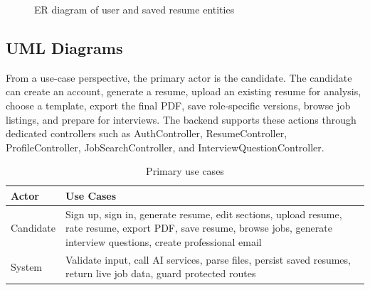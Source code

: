 \begin{figure}[H]
\centering
{}
\caption{ER diagram of user and saved resume entities}
\end{figure}

\subsection{UML Diagrams}
\noindent From a use-case perspective, the primary actor is the candidate. The candidate can create an account, generate a resume, upload an existing resume for analysis, choose a template, export the final PDF, save role-specific versions, browse job listings, and prepare for interviews. The backend supports these actions through dedicated controllers such as AuthController, ResumeController, ProfileController, JobSearchController, and InterviewQuestionController.

\begin{table}[H]
\centering
\caption{Primary use cases}
\begin{tabular}{|p{3.3cm}|p{8.8cm}|}
\hline
\textbf{Actor} & \textbf{Use Cases} \\
\hline
Candidate & Sign up, sign in, generate resume, edit sections, upload resume, rate resume, export PDF, save resume, browse jobs, generate interview questions, create professional email \\
\hline
System & Validate input, call AI services, parse files, persist saved resumes, return live job data, guard protected routes \\
\hline
\end{tabular}
\end{table}

